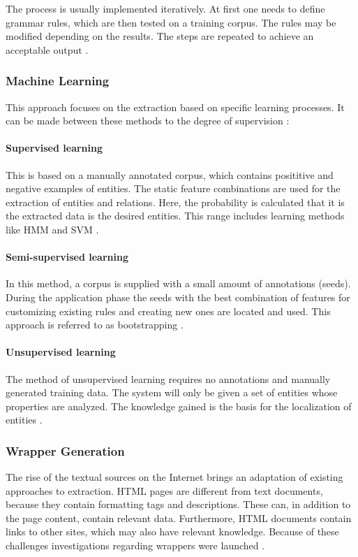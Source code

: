 The process is usually implemented iteratively. At first one needs to define grammar rules, which are then tested on a training corpus. The rules may be modified depending on the results. The steps are repeated to achieve an acceptable output \cite{Appelt:1999}.

\subsubsection{Machine Learning}
This approach focuses on the extraction based on specific learning processes. It can be made between these methods to the degree of supervision \cite{Carstensen:2010}\cite{Schramm:2008}:

\paragraph{Supervised learning}
This is based on a manually annotated corpus, which contains posititive and negative examples of entities. The static feature combinations are used for the extraction of entities and relations. Here, the probability is calculated that it is the extracted data is the desired entities. This range includes learning methods like \gls{HMM} and \gls{SVM} \cite{Schramm:2008}\cite{Siefkes:2005}\cite{Carstensen:2010}.

\paragraph{Semi-supervised learning}
In this method, a corpus is supplied with a small amount of annotations (seeds). During the application phase the seeds with the best combination of features for customizing existing rules and creating new ones are located and used. This approach is referred to as bootstrapping \cite{Carstensen:2010}\cite{Chang:2006}.

\paragraph{Unsupervised learning}
The method of unsupervised learning requires no annotations and manually generated training data. The system will only be given a set of entities whose properties are analyzed. The knowledge gained is the basis for the localization of entities \cite{Carstensen:2010}\cite{Schramm:2008}. 

\subsubsection{Wrapper Generation}
The rise of the textual sources on the Internet brings an adaptation of existing approaches to extraction. HTML pages are different from text documents, because they contain formatting tags and descriptions. These can, in addition to the page content, contain relevant data. Furthermore, HTML documents contain links to other sites, which may also have relevant knowledge. Because of these challenges investigations regarding wrappers were launched  \cite{Eikvil:1999}\cite{Freitag:2000}\cite{Linsmayr:2010}.


